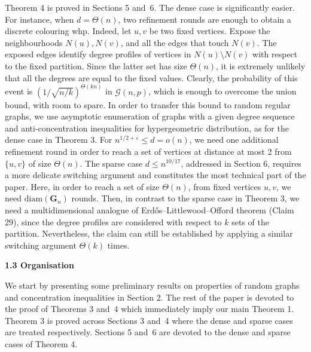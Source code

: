 \documentclass[10pt,a4paper]{article}
\begin{document}
Theorem 4 is proved in Sections 5 and 6. The dense case is significantly easier. For instance, when $d=\Theta(n)$, two refinement rounds are enough to obtain a discrete colouring whp. Indeed, let $u,v$ be two fixed vertices. Expose the neighbourhoods $N(u),N(v)$, and all the edges that touch $N(v)$. The exposed edges identify degree profiles of vertices in $N(u)\setminus N(v)$ with respect to the fixed partition. Since the latter set has size $\Theta(n)$, it is extremely unlikely that all the degrees are equal to the fixed values. Clearly, the probability of this event is $\left(1/\sqrt{n/k}\right)^{\Theta(kn)}$ in $\mathcal{G}(n,p)$, which is enough to overcome the union bound, with room to spare. In order to transfer this bound to random regular graphs, we use asymptotic enumeration of graphs with a given degree sequence and anti-concentration inequalities for hypergeometric distribution, as for the dense case in Theorem 3. For $n^{1/2+\varepsilon}\leq d=o(n)$, we need one additional refinement round in order to reach a set of vertices at distance at most 2 from $\{u,v\}$ of size $\Theta(n)$. The sparse case $d\leq n^{10/17}$, addressed in Section 6, requires a more delicate switching argument and constitutes the most technical part of the paper. Here, in order to reach a set of size $\Theta(n)$, from fixed vertices $u,v$, we need $\mathrm{diam}(\mathbf{G}_{n})$ rounds. Then, in contrast to the sparse case in Theorem 3, we need a multidimensional analogue of Erdős–Littlewood–Offord theorem (Claim 29), since the degree profiles are considered with respect to $k$ sets of the partition. Nevertheless, the claim can still be established by applying a similar switching argument $\Theta(k)$ times.\par





\par\medskip\noindent\textbf{
1.3 Organisation}\par




We start by presenting some preliminary results on properties of random graphs and concentration inequalities in Section 2. The rest of the paper is devoted to the proof of Theorems 3 and 4 which immediately imply our main Theorem 1. Theorem 3 is proved across Sections 3 and 4 where the dense and sparse cases are treated respectively. Sections 5 and 6 are devoted to the dense and sparse cases of Theorem 4.\par
\end{document}
